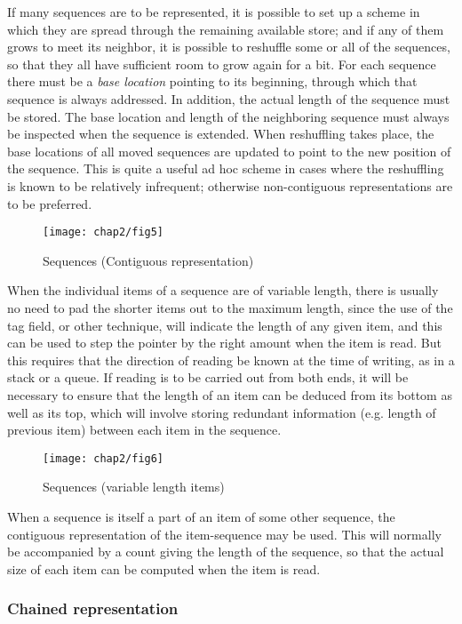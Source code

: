 If many sequences are to be represented, it is possible to set up a scheme in which they are spread through the remaining available store; and if any of them grows to meet its neighbor, it is possible to reshuffle some or all of the sequences, so that they all have sufficient room to grow again for a bit. For each sequence there must be a \textit{base location} pointing to its beginning, through which that sequence is always addressed. In addition, the actual length of the sequence must be stored. The base location and length of the neighboring sequence must always be inspected when the sequence is extended. When reshuffling takes place, the base locations of all moved sequences are updated to point to the new position of the sequence. This is quite a useful ad hoc scheme in cases where the reshuffling is known to be relatively infrequent; otherwise non-contiguous representations are to be preferred.

\begin{figure}[h]
	\centering
	\texttt{[image: chap2/fig5]}
	\caption{Sequences (Contiguous representation)}
\end{figure}

When the individual items of a sequence are of variable length, there is usually no need to pad the shorter items out to the maximum length, since the use of the tag field, or other technique, will indicate the length of any given item, and this can be used to step the pointer by the right amount when the item is read. But this requires that the direction of reading be known at the time of writing, as in a stack or a queue. If reading is to be carried out from both ends, it will be necessary to ensure that the length of an item can be deduced from its bottom as well as its top, which will involve storing redundant information (e.g. length of previous item) between each item in the sequence.

\begin{figure}[h]
	\centering
	\texttt{[image: chap2/fig6]}
	\caption{Sequences (variable length items)}
\end{figure}

When a sequence is itself a part of an item of some other sequence, the contiguous representation of the item-sequence may be used. This will normally be accompanied by a count giving the length of the sequence, so that the actual size of each item can be computed when the item is read.

\subsubsection{Chained representation}

